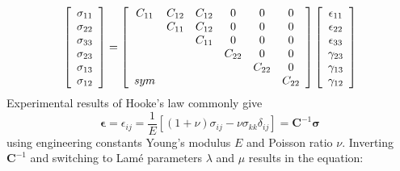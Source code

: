 \documentclass[m,times]{cgMA}
\begin{document}
\begin{equation} \label{eq:voigt}
  \left[ \begin{array} {c}
      {\sigma_{11}}\\
      {\sigma_{22}}\\
      {\sigma_{33}}\\
      {\sigma_{23}}\\
      {\sigma_{13}}\\
      {\sigma_{12}}\\
  \end{array} \right]
  = \left[ \begin{array} { c c c c c c }
      { C _ { 11 }   } & { C _ { 12 } } & { C _ { 12 } } & 0                & 0                & 0 \\
      {}               & { C _ { 11 } } & { C _ { 12 } } & 0                & 0                & 0 \\
      {}               & {}             & { C _ { 11 } } & 0                & 0                & 0 \\
      {}               & {}             & {}             & { C _ { 22 } }   & 0                & 0 \\
      {}               & {}             & {}             & {}               & { C _ { 22 } }   & 0 \\
      {sym}            & {}             & {}             & {}               & {}               & { C _ { 22 } } \\
  \end{array} \right]
  \left[ \begin{array} {c}
      {\epsilon_{11}}\\
      {\epsilon_{22}}\\
      {\epsilon_{33}}\\
      {\gamma_{23}}\\
      {\gamma_{13}}\\
      {\gamma_{12}}\\
  \end{array} \right]
\end{equation}
Experimental results of Hooke's law commonly give
\begin{equation}
  \boldsymbol{\epsilon} =
  \epsilon _ { i j } = \frac { 1 } { E } \left[ ( 1 + \nu ) \sigma _ { i j } - \nu \sigma _ { k k } \delta _ { i j } \right]
  = \mathbf{C}^{-1} \bm{\sigma}
\end{equation}
using engineering constants Young's modulus $E$ and Poisson ratio $\nu$. Inverting $\mathbf{C}^{-1}$ and switching to Lamé parameters $\lambda$ and $\mu$ results in the equation:
\end{document}
